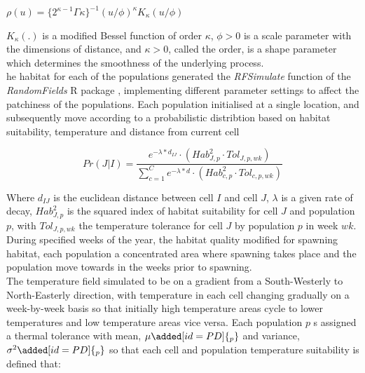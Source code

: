 \documentclass[review]{elsarticle}
\begin{document}
\begin{center}
	$\rho(u) = \{2^{\kappa -
		1}\Gamma{\kappa}\}^{-1}(u/\phi)^{\kappa}K_{\kappa}(u/\phi)$
\end{center}
	
$K_{\kappa}(.)$ is a modified Bessel function of order $\kappa$, $\phi >
0$ is a scale parameter with the dimensions of distance, and $\kappa > 0$,
called the order, is a shape parameter which determines the smoothness of the
underlying process. \\

he habitat for each of the
populations  generated 
the \textit{RFSimulate} function of the \textit{RandomFields} R package
\citep{Schlater2015}, implementing different parameter settings to affect the
patchiness of the populations. Each population 
initialised at a single location, and subsequently move
according to a probabilistic distribtion based on habitat
suitability, temperature and distance from current cell 

\begin{equation}
	Pr(J | I) = \frac{e^{-\lambda * d_{IJ}} \cdot
		(Hab_{J,p}^2 \cdot Tol_{J,p,wk})}{\sum\limits_{c=1}^{C}e^{-\lambda * d} \cdot
		(Hab_{c,p}^2 \cdot Tol_{c,p,wk})}
\end{equation}

Where $d_{IJ}$ is the euclidean distance between cell $I$ and cell $J$,
$\lambda$ is a given rate of decay, $Hab_{J,p}^2$ is the squared index of
habitat suitability for cell $J$ and population $p$, with $Tol_{J,p,wk}$ the
temperature tolerance for cell $J$ by population $p$ in week $wk$.\\

During specified weeks of the year, the habitat quality
 modified for  spawning
habitat,  each
population  a concentrated area where spawning takes
place and the population move towards
 in the weeks prior to
spawning. \\

The temperature field  simulated to be on a gradient
from a South-Westerly to North-Easterly direction, with temperature in each
cell changing gradually on a week-by-week basis so that initially high
temperature areas cycle to lower temperatures and low
temperature areas vice versa. Each population $p$ s
assigned a thermal tolerance with mean, $\mu\added[id=PD]{_{p}}$ and variance,
$\sigma^2\added[id=PD]{_{p}}$ so that each cell and population temperature
suitability is defined that:
\end{document}
